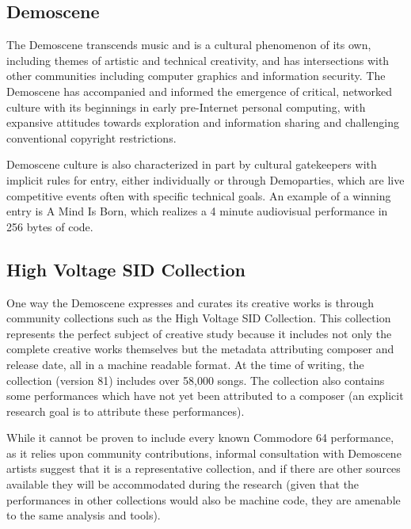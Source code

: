 \documentclass[10pt]{article}
\begin{document}
\begin{multicols*}{2}
\subsection{Demoscene}

The Demoscene transcends music and is a cultural phenomenon of its own\cite{hackingpractices}, including themes of artistic and technical creativity, and has intersections with other communities including computer graphics\cite{siggraphdemo} and information security\cite{layerone}. The Demoscene has accompanied and informed the emergence of critical, networked culture with its beginnings in early pre-Internet personal computing\cite{pioneers}, with expansive attitudes towards exploration and information sharing and challenging conventional copyright restrictions.

Demoscene culture is also characterized in part by cultural gatekeepers with implicit rules for entry\cite{gatekeepers}, either individually or through Demoparties\cite{assembly}, which are live competitive events often with specific technical goals. An example of a winning entry is A Mind Is Born\cite{amib}, which realizes a 4 minute audiovisual performance in 256 bytes of code.

\subsection{High Voltage SID Collection}
\label{hvsc}

One way the Demoscene expresses and curates its creative works is through community collections such as the High Voltage SID Collection\cite{hvsc}. This collection represents the perfect subject of creative study because it includes not only the complete creative works themselves but the metadata attributing composer and release date, all in a machine readable format. At the time of writing, the collection (version 81) includes over 58,000 songs. The collection also contains some performances which have not yet been attributed to a composer (an explicit research goal is to attribute these performances).

While it cannot be proven to include every known Commodore 64 performance, as it relies upon community contributions, informal consultation with Demoscene artists suggest that it is a representative collection, and if there are other sources available they will be accommodated during the research (given that the performances in other collections would also be machine code, they are amenable to the same analysis and tools).


\end{multicols*}
\end{document}
